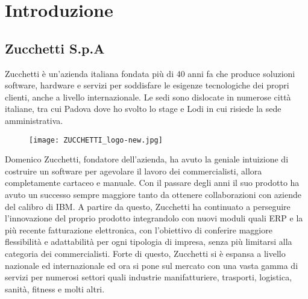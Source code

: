 
\chapter{Introduzione}
\label{cap:introduzione}





\section{Zucchetti S.p.A}
Zucchetti è un'azienda italiana fondata più di 40 anni fa che produce soluzioni software, hardware e servizi per soddisfare le esigenze tecnologiche dei propri clienti, anche a livello internazionale. Le sedi sono dislocate in numerose città italiane, tra cui Padova dove ho svolto lo stage e Lodi in cui risiede la sede amministrativa.


\begin{figure}[htbp]
	\begin{center}
		\texttt{[image: ZUCCHETTI\_logo-new.jpg]}
	\end{center}
\end{figure}

Domenico Zucchetti, fondatore dell'azienda, ha avuto la geniale intuizione di costruire un software per agevolare il lavoro dei commercialisti, allora completamente cartaceo e manuale. Con il passare degli anni il suo prodotto ha avuto un successo sempre maggiore tanto da ottenere collaborazioni con aziende del calibro di IBM. A partire da questo, Zucchetti ha continuato a perseguire l'innovazione del proprio prodotto integrandolo con nuovi moduli quali ERP e la più recente fatturazione elettronica, con l'obiettivo di conferire maggiore flessibilità e adattabilità per ogni tipologia di impresa, senza più limitarsi alla categoria dei commercialisti. Forte di questo, Zucchetti si è espansa a livello nazionale ed internazionale ed ora si pone sul mercato con una vasta gamma di servizi per numerosi settori quali industrie manifatturiere, trasporti, logistica, sanità, fitness e molti altri. \\

